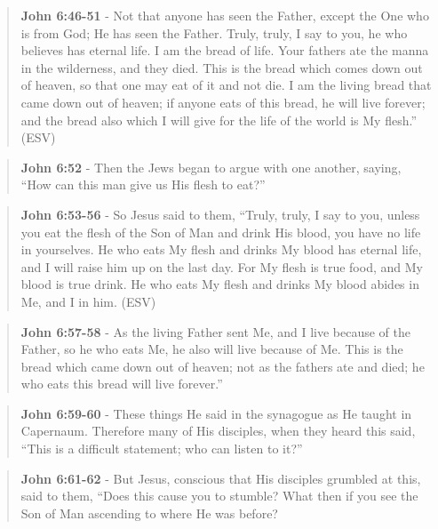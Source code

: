 \documentclass[11pt]{article}
\begin{document}
\begin{quote}
\textbf{John 6:46-51} - Not that anyone has seen the Father, except the One who is from God; He has seen the Father. Truly, truly, I say to you, he who believes has eternal life. I am the bread of life. Your fathers ate the manna in the wilderness, and they died. This is the bread which comes down out of heaven, so that one may eat of it and not die. I am the living bread that came down out of heaven; if anyone eats of this bread, he will live forever; and the bread also which I will give for the life of the world is My flesh.” (ESV)
\end{quote}

\begin{quote}
\textbf{John 6:52} - Then the Jews began to argue with one another, saying, “How can this man give us His flesh to eat?”
\end{quote}

\begin{quote}
\textbf{John 6:53-56} - So Jesus said to them, “Truly, truly, I say to you, unless you eat the flesh of the Son of Man and drink His blood, you have no life in yourselves. He who eats My flesh and drinks My blood has eternal life, and I will raise him up on the last day. For My flesh is true food, and My blood is true drink. He who eats My flesh and drinks My blood abides in Me, and I in him. (ESV)
\end{quote}

\begin{quote}
\textbf{John 6:57-58} - As the living Father sent Me, and I live because of the Father, so he who eats Me, he also will live because of Me. This is the bread which came down out of heaven; not as the fathers ate and died; he who eats this bread will live forever.”
\end{quote}

\begin{quote}
\textbf{John 6:59-60} - These things He said in the synagogue as He taught in Capernaum. Therefore many of His disciples, when they heard this said, “This is a difficult statement; who can listen to it?”
\end{quote}

\begin{quote}
\textbf{John 6:61-62} - But Jesus, conscious that His disciples grumbled at this, said to them, “Does this cause you to stumble? What then if you see the Son of Man ascending to where He was before?
\end{quote}
\end{document}
